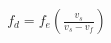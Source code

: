 \documentclass[preview]{standalone}
\begin{document}
\begin{align*}
f_d =f_e \left(\frac{v_s}{v_s-v_f}\right)
\end{align*}
\end{document}
